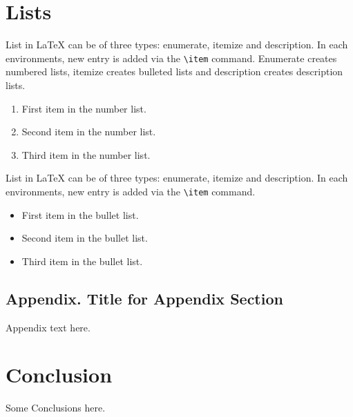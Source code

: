 \documentclass[journal=gmj]{CUP-JNL-DTM}%
\theoremstyle{definition}
\numberwithin{equation}{section}
\begin{document}
\section{Lists}

List in \LaTeX{} can be of three types: enumerate, itemize and description.
In each environments, new entry is added via the \verb+\item+ command.
Enumerate creates numbered lists, itemize creates bulleted lists and
description creates description lists.
\begin{enumerate}[1.]
\item First item in the number list.
\item Second item in the number list.
\item Third item in the number list.
\end{enumerate}
List in \LaTeX{} can be of three types: enumerate, itemize and description.
In each environments, new entry is added via the \verb+\item+ command.
\begin{itemize}
\item First item in the bullet list.
\item Second item in the bullet list.
\item Third item in the bullet list.
\end{itemize}

\begin{appendix}
\section{Appendix. Title for Appendix Section}\label{appendixA}
Appendix text here.
\end{appendix}


\section{Conclusion}

Some Conclusions here.
\end{document}
